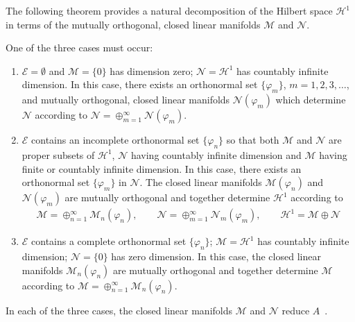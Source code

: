 \documentclass[leqno,onefignum,onetabnum]{siamltex1213}
\newcommand{\Ec}{\mathcal{E}}
\newcommand{\Mc}{\mathcal{M}}
\newcommand{\Nc}{\mathcal{N}}
\newcommand{\Hs}{\mathscr{H}}
\begin{document}
The following theorem provides a natural decomposition of the Hilbert
space $\Hs^1$ in terms of the mutually orthogonal, closed linear manifolds
$\Mc$ and $\Nc$.
%
\begin{theorem}
\label{thm:Hilbert_Eig_Decomp}  
One of the three cases must occur:
%
\begin{enumerate}
\item $\Ec=\emptyset$ and $\Mc=\{0\}$ has dimension zero; $\Nc=\Hs^1$
has countably infinite dimension. In this case, there exists an
orthonormal set $\{\varphi_m\}$, $m=1,2,3,\ldots$, and mutually orthogonal, closed
linear manifolds $\Nc(\varphi_m)$ which determine $\Nc$ according to
$\Nc=\oplus_{m=1}^\infty\Nc(\varphi_m)$.    
\item $\Ec$ contains an incomplete orthonormal set $\{\varphi_n\}$ so that
both $\Mc$ and $\Nc$ are proper subsets of $\Hs^1$, $\Nc$ having
countably infinite dimension and $\Mc$ having finite or countably
infinite dimension. In this case, there exists an orthonormal set
$\{\varphi_m\}$ in $\Nc$. The closed linear manifolds $\Mc(\varphi_n)$ and
$\Nc(\varphi_m)$ are mutually orthogonal and together determine $\Hs^1$
according to   
%
\begin{align*}
  \Mc=\oplus_{n=1}^\infty\Mc_n(\varphi_n), \qquad
  \Nc=\oplus_{m=1}^\infty\Nc_m(\varphi_m), \qquad
  \Hs^1=\Mc\oplus\Nc
\end{align*}
%
\item $\Ec$ contains a complete orthonormal set $\{\varphi_n\}$; $\Mc=\Hs^1$
has countably infinite dimension; $\Nc=\{0\}$ has zero dimension. In
this case, the closed linear manifolds $\Mc_n(\varphi_n)$ are mutually
orthogonal and together determine $\Mc$ according 
to $\Mc=\oplus_{n=1}^\infty\Mc_n(\varphi_n)$.     
\end{enumerate}
%
In each of the three cases, the closed linear manifolds $\Mc$ and
$\Nc$ reduce $A$~\cite{Stone:64}.
\end{theorem}
\end{document}
